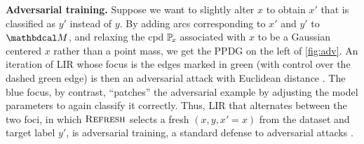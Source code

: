 \textbf{Adversarial training.}
Suppose we want to slightly alter $x$ to obtain $x'$ that is classified as $y'$ instead of $y$.
By adding arcs corresponding to $x'$ and $y'$ to $\dg M$,
    and relaxing the cpd $\p_x$ associated with $x$ to be a Gaussian centered $x$ rather than a point mass,
    we get the PPDG on the left of \cref{fig:adv}.
%
An iteration of LIR
whose focus is the edges marked in green (with control over the dashed green edge)
is then an adversarial attack with Euclidean distance \citep{biggio2013advattk}.
The blue focus, by contrast, ``patches'' the adversarial example by
    adjusting the model parameters to again classify it correctly.
Thus, LIR
that alternates between the two foci,
in which $\textsc{Refresh}$ selects a fresh $(x,y,x'=x)$ from the dataset
    and target label $y'$,
is
adversarial training, a standard defense to adversarial attacks \citep{goodfellow2014explaining}.
%


